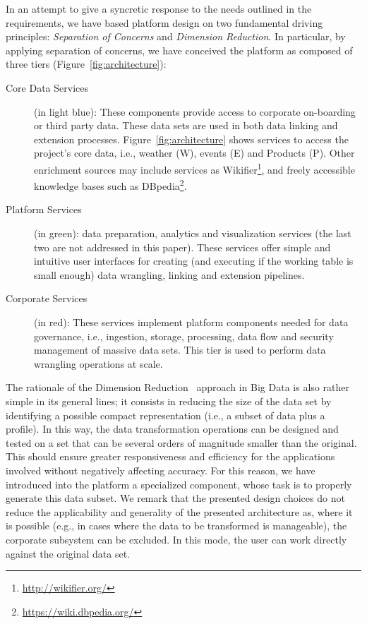 In an attempt to give a syncretic response to the needs outlined in the requirements, we have based platform design on two fundamental driving principles:  \textit{Separation of Concerns} and \textit{Dimension Reduction}.  
In particular, by applying separation of concerns, we have conceived the platform as composed of three tiers (Figure~\ref{fig:architecture}):

\begin{description}
    \item[Core Data Services] (in light blue): These components provide access to corporate on-boarding or third party data. These data sets are used in both data linking and extension processes. Figure~\ref{fig:architecture} shows services to access the project's core data, i.e., weather (W), events (E) and Products (P). Other enrichment sources may include services as Wikifier\footnote{\url{http://wikifier.org/}}, and freely accessible knowledge bases such as DBpedia\footnote{\url{https://wiki.dbpedia.org/}}.
    \item[Platform Services] (in green): data preparation, analytics and visualization services (the last two are not addressed in this paper). These services offer simple and intuitive user interfaces for creating (and executing if the working table is small enough) data wrangling, linking and extension pipelines.
    \item[Corporate Services] (in red): These services implement platform components needed for data governance, i.e., ingestion, storage, processing, data flow and security management of massive data sets. This tier is used to perform data wrangling operations at scale. 
\end{description}


The rationale of the Dimension Reduction~\cite{rojas2017sampling, ur2016big} approach in Big Data is also rather simple in its general lines; it consists in reducing the size of the data set by identifying a possible compact representation (i.e., a subset of data plus a profile). In this way, the data transformation operations can be designed and tested on a set that can be several orders of magnitude smaller than the original. This should ensure greater responsiveness and efficiency for the applications involved without negatively affecting accuracy. For this reason, we have introduced into the platform a specialized component, whose task is to properly generate this data subset. 
We remark that the presented design choices do not reduce the applicability and generality of the presented architecture as, where it is possible (e.g., in cases where the data to be transformed is manageable), the corporate subsystem can be excluded. In this mode, the user can work directly against the original data set.


